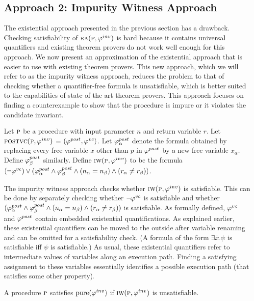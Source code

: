 \subsection{Approach 2: Impurity Witness Approach}

The existential approach presented in the previous section has a drawback. Checking satisfiability of $\textsc{ea}(\textsc{p},\varphi^{inv})$
is hard because it contains universal quantifiers and existing theorem provers do not work well enough for this
approach. We now present an approximation of the existential approach that is easier to use with existing theorem
provers. This new approach, which we will refer to as the impurity witness approach, reduces the problem to
that of checking whether a quantifier-free formula is unsatisfiable, which is better suited to the capabilities of
state-of-the-art theorem provers. This approach focuses on finding a counterexample to show that the
procedure is impure or it violates the candidate invariant.

Let $\textsc{p}$ be a procedure with input parameter $n$ and return variable $r$.
Let $\textsc{postvc}({\textsc{p}},{\varphi^{inv}})$ = $(\varphi^{post},\varphi^{vc})$.
Let $\varphi^{post}_\alpha$ denote the formula obtained by replacing every free variable $x$ other than $p$ in $\varphi^{post}$
by a new free variable $x_\alpha$. Define $\varphi^{post}_\beta$ similarly.
Define $\textsc{iw}(\textsc{p}, \varphi^{inv})$ to be the formula $(\neg \varphi^{vc}) \vee (\varphi^{post}_\alpha \wedge \varphi^{post}_\beta \wedge (n_\alpha = n_\beta) \wedge (r_\alpha \neq r_\beta))$.

The impurity witness approach checks whether $\textsc{iw}(\textsc{p}, \varphi^{inv})$ is satisfiable. This can be done by separately checking
whether $\neg \varphi^{vc}$ is satisfiable and whether $(\varphi^{post}_\alpha \wedge \varphi^{post}_\beta \wedge (n_\alpha = n_\beta) \wedge (r_\alpha \neq r_\beta))$
is satisfiable. As formally defined, $\varphi^{vc}$ and $\varphi^{post}$ contain embedded existential quantifications. As explained earlier,
these existential quantifiers can be moved to the outside after variable renaming and can be omitted for a satisfiability check.
(A formula of the form $\exists \overline{x}. \psi$ is satisfiable iff $\psi$ is satisfiable.)
As usual, these existential quantifiers refer to intermediate values of variables along an execution path.
Finding a satisfying assignment to these variables essentially identifies a possible execution path (that
satisfies some other property).

\begin{theorem}
A procedure $\textsc{p}$ satisfies  $\mathrm{pure}(\varphi^{inv})$ if $\textsc{iw}(\textsc{p}, \varphi^{inv})$ is unsatisfiable.
\end{theorem}

